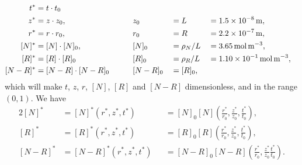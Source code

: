 \documentclass{article}
\begin{document}
\begin{alignat*}{4}
    t^* &= t \cdot t_0 \\
    z^* &= z \cdot z_0, \quad\quad & &z_0 & &= L &&= \SI{1.5d-8}{\meter}, \\
    r^* &= r \cdot r_0, \quad\quad & &r_0 & &= R  &&= \SI{2.2d-7}{\meter},\\
    [N]^* &= [N]\cdot [N]_0, \quad\quad & &[N]_0 & &= \rho_N / L  &&= \SI{3.65}{\mol\per\cubic\meter},\\
    [R]^* &= [R]\cdot [R]_0  \quad\quad & &[R]_0 & &= \rho_R / L &&= \SI{1.10d-1}{\mol\per\cubic\meter},\\
    [N-R]^* &= [N-R]\cdot [N-R]_0 \quad\quad & & [N-R]_0 & &= [R]_0,
\end{alignat*}
which will make $t$, $z$, $r$, $[N]$, $[R]$ and $[N-R]$ dimensionless, and in the range $(0,1)$.
We have
\begin{alignat*}{2}
 [N]^* &= [N]^*(r^*, z^*, t^*) &&= [N]_0 [N]\left(\frac{r^*}{r_0}, \frac{z^*}{z_0}, \frac{t^*}{t_0}\right), \\
 [R]^* &= [R]^*(r^*, z^*, t^*) &&= [R]_0 [R]\left(\frac{r^*}{r_0}, \frac{z^*}{z_0}, \frac{t^*}{t_0}\right), \\
 [N-R]^* &= [N-R]^*(r^*, z^*, t^*) &&= [N-R]_0[N-R]\left(\frac{r^*}{r_0}, \frac{z^*}{z_0} \frac{t^*}{t_0}\right). \\
\end{alignat*}
\end{document}
